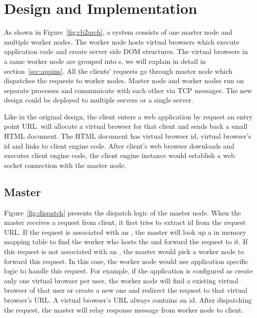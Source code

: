 \section{Design and Implementation}
\label{sec:implementation}
As shown in Figure~\ref{fig:cb2arch}, a \cb{} system consists of one master node and multiple worker nodes.
The worker node hosts virtual browsers which execute application code and create server
side DOM structures.
The virtual browsers in a same worker node are grouped into \appins{}s,
we will explain \appins{} in detail in section~\ref{sec:appins}.
All the clients' requests go through master node which dispatches the requests to 
worker nodes.
Master node and worker nodes run on separate processes and communicate with each other
via TCP messages.
The new design could be deployed to multiple servers or a single server.

Like in the original design,
the client enters a web application by request an entry point URL.
\cb{} will allocate a virtual browser for that client and sends back 
a small HTML document.
The HTML document has virtual browser id, virtual browser's \appins{} id and links to client engine code.
After client's web browser downloads and executes client engine code,
the client engine instance would establish a web socket connection with the master node. 


\newarchitectureoverview{}




\subsection{Master}
Figure~\ref{fig:dispatch} presents the dispatch logic of the master node.
When the master receives a request from client,
it first tries to extract \appins{} id from the request URL.
If the request is associated with an \appins{}, 
the master will look up a in memory mapping table to find the worker
who hosts the \appins{} and forward the request to it.
If this request is not associated with an \appins{}, 
the master would pick a worker node to forward this request.
In this case, the worker node would use application specific logic to handle this request.
For example, if the application is configured as create only one virtual browser per user, 
the worker node will find a existing virtual browser of that user or create a new one 
and redirect the request to that virtual browser's URL.
A virtual browser's URL always contains an \appins{} id.
After dispatching the request, 
the master will relay response message from worker node to client.

